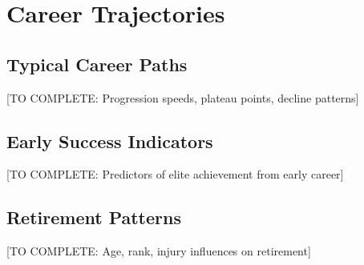 \section{Career Trajectories}

\subsection{Typical Career Paths}

[TO COMPLETE: Progression speeds, plateau points, decline patterns]

\subsection{Early Success Indicators}

[TO COMPLETE: Predictors of elite achievement from early career]

\subsection{Retirement Patterns}

[TO COMPLETE: Age, rank, injury influences on retirement]